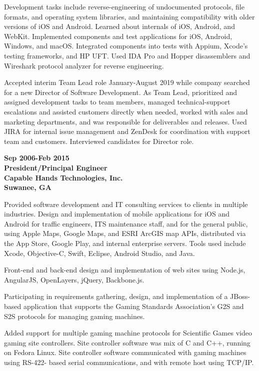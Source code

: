 Development tasks include reverse-engineering of undocumented protocols,
file formats, and operating system libraries, and maintaining
compatibility with older versions of iOS and Android. Learned about
internals of iOS, Android, and WebKit. Implemented components and test
applications for iOS, Android, Windows, and macOS. Integrated components
into tests with Appium, Xcode's testing frameworks, and HP UFT. Used IDA
Pro and Hopper disassemblers and Wireshark protocol analyzer for reverse
engineering.

Accepted interim Team Lead role January-August 2019 while company
searched for a new Director of Software Development. As Team Lead,
prioritized and assigned development tasks to team members, managed
technical-support escalations and assisted customers directly when
needed, worked with sales and marketing departments, and was responsible
for deliverables and releases. Used JIRA for internal issue management
and ZenDesk for coordination with support team and customers.
Interviewed candidates for Director role.

\textbf{Sep 2006-Feb 2015\\
President/Principal Engineer\\
Capable Hands Technologies, Inc.\\
Suwanee, GA}

Provided software development and IT consulting services to clients in
multiple industries. Design and implementation of mobile applications
for iOS and Android for traffic engineers, ITS maintenance staff, and
for the general public, using Apple Maps, Google Maps, and ESRI ArcGIS
map APIs, distributed via the App Store, Google Play, and internal
enterprise servers. Tools used include Xcode, Objective-C, Swift,
Eclipse, Android Studio, and Java.

Front-end and back-end design and implementation of web sites using
Node.js, AngularJS, OpenLayers, jQuery, Backbone.js.

Participating in requirements gathering, design, and implementation of a
JBoss-based application that supports the Gaming Standards Association's
G2S and S2S protocols for managing gaming machines.

Added support for multiple gaming machine protocols for Scientific Games
video gaming site controllers. Site controller software was mix of C and
C++, running on Fedora Linux. Site controller software communicated with
gaming machines using RS-422- based serial communications, and with
remote host using TCP/IP.

